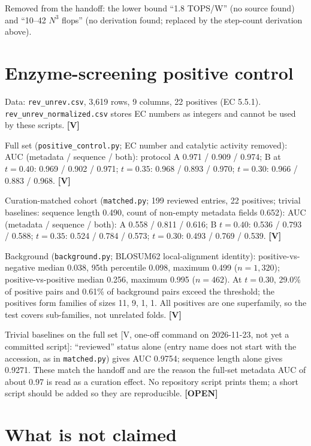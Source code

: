 \documentclass[11pt]{article}
\newcommand{\V}{\textbf{[V]}}
\newcommand{\OPEN}{\textbf{[OPEN]}}
\newcommand{\scr}[1]{\texttt{#1}}
\begin{document}
Removed from the handoff: the lower bound ``1.8 TOPS/W'' (no source found) and ``10--42 $N^3$ flops'' (no derivation found; replaced by the step-count derivation above).

\section{Enzyme-screening positive control}\label{sec:enzyme}

Data: \scr{rev\_unrev.csv}, 3,619 rows, 9 columns, 22 positives (EC 5.5.1). \scr{rev\_unrev\_normalized.csv} stores EC numbers as integers and cannot be used by these scripts. \V

Full set (\scr{positive\_control.py}; EC number and catalytic activity removed): AUC (metadata / sequence / both): protocol A 0.971 / 0.909 / 0.974; B at $t = 0.40$: 0.969 / 0.902 / 0.971; $t = 0.35$: 0.968 / 0.893 / 0.970; $t = 0.30$: 0.966 / 0.883 / 0.968. \V

Curation-matched cohort (\scr{matched.py}; 199 reviewed entries, 22 positives; trivial baselines: sequence length 0.490, count of non-empty metadata fields 0.652): AUC (metadata / sequence / both): A 0.558 / 0.811 / 0.616; B $t = 0.40$: 0.536 / 0.793 / 0.588; $t = 0.35$: 0.524 / 0.784 / 0.573; $t = 0.30$: 0.493 / 0.769 / 0.539. \V

Background (\scr{background.py}; BLOSUM62 local-alignment identity): positive-vs-negative median 0.038, 95th percentile 0.098, maximum 0.499 ($n = 1{,}320$); positive-vs-positive median 0.256, maximum 0.995 ($n = 462$). At $t = 0.30$, 29.0\% of positive pairs and 0.61\% of background pairs exceed the threshold; the positives form families of sizes 11, 9, 1, 1. All positives are one superfamily, so the test covers sub-families, not unrelated folds. \V

Trivial baselines on the full set [V, one-off command on 2026-11-23, not yet a committed script]: ``reviewed'' status alone (entry name does not start with the accession, as in \scr{matched.py}) gives AUC 0.9754; sequence length alone gives 0.9271. These match the handoff and are the reason the full-set metadata AUC of about 0.97 is read as a curation effect. No repository script prints them; a short script should be added so they are reproducible. \OPEN

\section{What is not claimed}\label{sec:notclaimed}
\end{document}
